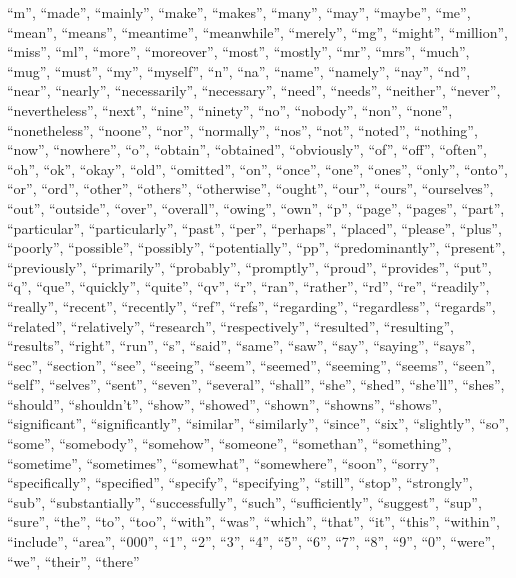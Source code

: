 \documentclass[midd]{thesis}
\begin{document}
``m'', ``made'', ``mainly'', ``make'', ``makes'', ``many'', ``may'', ``maybe'', ``me'', ``mean'', ``means'', ``meantime'', ``meanwhile'', ``merely'', ``mg'', ``might'', ``million'', ``miss'', ``ml'', ``more'', ``moreover'', ``most'', ``mostly'', ``mr'', ``mrs'', ``much'', ``mug'', ``must'', ``my'', ``myself'', ``n'', ``na'', ``name'', ``namely'', ``nay'', ``nd'', ``near'', ``nearly'', ``necessarily'', ``necessary'', ``need'', ``needs'', ``neither'', ``never'', ``nevertheless'', ``next'', ``nine'', ``ninety'', ``no'', ``nobody'', ``non'', ``none'', ``nonetheless'', ``noone'', ``nor'', ``normally'', ``nos'', ``not'', ``noted'', ``nothing'', ``now'', ``nowhere'', ``o'', ``obtain'', ``obtained'', ``obviously'', ``of'', ``off'', ``often'', ``oh'', ``ok'', ``okay'', ``old'', ``omitted'', ``on'', ``once'', ``one'', ``ones'', ``only'', ``onto'', ``or'', ``ord'', ``other'', ``others'', ``otherwise'', ``ought'', ``our'', ``ours'', ``ourselves'', ``out'', ``outside'', ``over'', ``overall'', ``owing'', ``own'', ``p'', ``page'', ``pages'', ``part'', ``particular'', ``particularly'', ``past'', ``per'', ``perhaps'', ``placed'', ``please'', ``plus'', ``poorly'', ``possible'', ``possibly'', ``potentially'', ``pp'', ``predominantly'', ``present'', ``previously'', ``primarily'', ``probably'', ``promptly'', ``proud'', ``provides'', ``put'', ``q'', ``que'', ``quickly'', ``quite'', ``qv'', ``r'', ``ran'', ``rather'', ``rd'', ``re'', ``readily'', ``really'', ``recent'', ``recently'', ``ref'', ``refs'', ``regarding'', ``regardless'', ``regards'', ``related'', ``relatively'', ``research'', ``respectively'', ``resulted'', ``resulting'', ``results'', ``right'', ``run'', ``s'', ``said'', ``same'', ``saw'', ``say'', ``saying'', ``says'', ``sec'', ``section'', ``see'', ``seeing'', ``seem'', ``seemed'', ``seeming'', ``seems'', ``seen'', ``self'', ``selves'', ``sent'', ``seven'', ``several'', ``shall'', ``she'', ``shed'', ``she'll'', ``shes'', ``should'', ``shouldn't'', ``show'', ``showed'', ``shown'', ``showns'', ``shows'', ``significant'', ``significantly'', ``similar'', ``similarly'', ``since'', ``six'', ``slightly'', ``so'', ``some'', ``somebody'', ``somehow'', ``someone'', ``somethan'', ``something'', ``sometime'', ``sometimes'', ``somewhat'', ``somewhere'', ``soon'', ``sorry'', ``specifically'', ``specified'', ``specify'', ``specifying'', ``still'', ``stop'', ``strongly'', ``sub'', ``substantially'', ``successfully'', ``such'', ``sufficiently'', ``suggest'', ``sup'', ``sure'', ``the'', ``to'', ``too'', ``with'', ``was'', ``which'', ``that'', ``it'', ``this'', ``within'', ``include'', ``area'', ``000'', ``1'', ``2'', ``3'', ``4'', ``5'', ``6'', ``7'', ``8'', ``9'', ``0'', ``were'', ``we'', ``their'', ``there''
\end{document}
